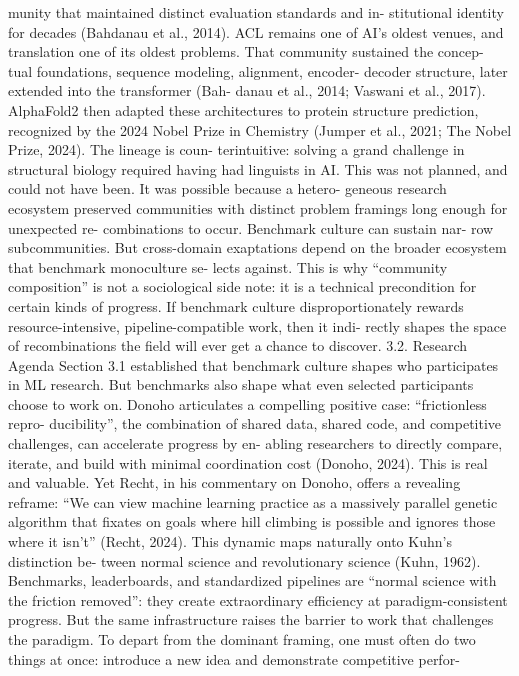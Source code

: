 munity that maintained distinct evaluation standards and in-
stitutional identity for decades (Bahdanau et al., 2014). ACL
remains one of AI’s oldest venues, and translation one of
its oldest problems. That community sustained the concep-
tual foundations, sequence modeling, alignment, encoder-
decoder structure, later extended into the transformer (Bah-
danau et al., 2014; Vaswani et al., 2017). AlphaFold2 then
adapted these architectures to protein structure prediction,
recognized by the 2024 Nobel Prize in Chemistry (Jumper
et al., 2021; The Nobel Prize, 2024). The lineage is coun-
terintuitive: solving a grand challenge in structural biology
required having had linguists in AI. This was not planned,
and could not have been. It was possible because a hetero-
geneous research ecosystem preserved communities with
distinct problem framings long enough for unexpected re-
combinations to occur. Benchmark culture can sustain nar-
row subcommunities. But cross-domain exaptations depend
on the broader ecosystem that benchmark monoculture se-
lects against.
This is why “community composition” is not a sociological
side note: it is a technical precondition for certain kinds of
progress. If benchmark culture disproportionately rewards
resource-intensive, pipeline-compatible work, then it indi-
rectly shapes the space of recombinations the field will ever
get a chance to discover.
3.2. Research Agenda
Section 3.1 established that benchmark culture shapes who
participates in ML research. But benchmarks also shape
what even selected participants choose to work on. Donoho
articulates a compelling positive case: “frictionless repro-
ducibility”, the combination of shared data, shared code,
and competitive challenges, can accelerate progress by en-
abling researchers to directly compare, iterate, and build
with minimal coordination cost (Donoho, 2024). This is
real and valuable. Yet Recht, in his commentary on Donoho,
offers a revealing reframe: “We can view machine learning
practice as a massively parallel genetic algorithm that fixates
on goals where hill climbing is possible and ignores those
where it isn’t” (Recht, 2024).
This dynamic maps naturally onto Kuhn’s distinction be-
tween normal science and revolutionary science (Kuhn,
1962).
Benchmarks, leaderboards, and standardized
pipelines are “normal science with the friction removed”:
they create extraordinary efficiency at paradigm-consistent
progress. But the same infrastructure raises the barrier to
work that challenges the paradigm. To depart from the
dominant framing, one must often do two things at once:
introduce a new idea and demonstrate competitive perfor-
